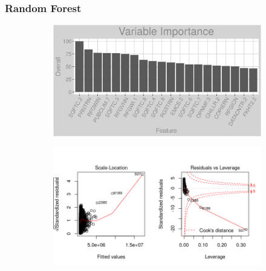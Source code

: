 \subsubsection{Random Forest}
\label{appendix:electricity:rf}
\begin{figure}[h]
\begin{subfigure}{1\textwidth}
\includegraphics[width=.99\textwidth, height=0.3\textheight]{Images/electricity_rf_vars.png}
\centering
\end{subfigure}
\begin{subfigure}{1\textwidth}
\includegraphics[width=.99\textwidth, height=0.475\textheight]{Images/electricity_rf_res_1.png}
\centering
\end{subfigure}
\end{figure}
\newpage
